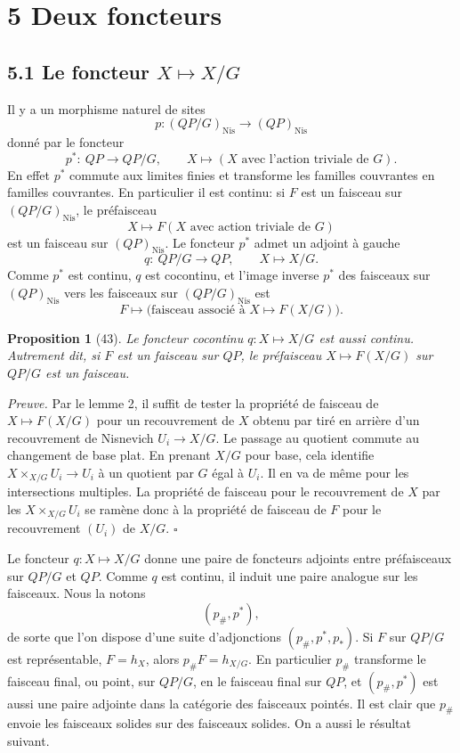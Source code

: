\documentclass[11pt]{article}
\newcommand{\Nis}{\mathrm{Nis}}
\theoremstyle{deligne}
\newtheorem*{proposition*}{Proposition}
\newenvironment{proofdel}{\noindent\textit{Preuve.}}{\hfill$\square$}
\begin{document}
\section*{5 Deux foncteurs}

\subsection*{5.1 Le foncteur \(X\mapsto X/G\)}

Il y a un morphisme naturel de sites
\[
p:(QP/G)_{\Nis}\longrightarrow (QP)_{\Nis}
\]
donné par le foncteur
\[
p^*:\ QP\longrightarrow QP/G,\qquad X\longmapsto (X\text{ avec l'action triviale de }G).
\]
En effet \(p^*\) commute aux limites finies et transforme les familles couvrantes en familles couvrantes. En particulier il est continu: si \(F\) est un faisceau sur \((QP/G)_{\Nis}\), le préfaisceau
\[
X\longmapsto F(X\text{ avec action triviale de }G)
\]
est un faisceau sur \((QP)_{\Nis}\). Le foncteur \(p^*\) admet un adjoint à gauche
\[
q:\ QP/G\longrightarrow QP,\qquad X\longmapsto X/G .
\]
Comme \(p^*\) est continu, \(q\) est cocontinu, et l'image inverse \(p^*\) des faisceaux sur \((QP)_{\Nis}\) vers les faisceaux sur \((QP/G)_{\Nis}\) est
\[
F\longmapsto \bigl(\text{faisceau associé à }X\longmapsto F(X/G)\bigr).
\]

\begin{proposition*}[43]
Le foncteur cocontinu \(q:X\mapsto X/G\) est aussi continu. Autrement dit, si \(F\) est un faisceau sur \(QP\), le préfaisceau \(X\mapsto F(X/G)\) sur \(QP/G\) est un faisceau.
\end{proposition*}

\begin{proofdel}
Par le lemme 2, il suffit de tester la propriété de faisceau de \(X\mapsto F(X/G)\) pour un recouvrement de \(X\) obtenu par tiré en arrière d'un recouvrement de Nisnevich \(U_i\to X/G\). Le passage au quotient commute au changement de base plat. En prenant \(X/G\) pour base, cela identifie \(X\times_{X/G}U_i\to U_i\) à un quotient par \(G\) égal à \(U_i\). Il en va de même pour les intersections multiples. La propriété de faisceau pour le recouvrement de \(X\) par les \(X\times_{X/G}U_i\) se ramène donc à la propriété de faisceau de \(F\) pour le recouvrement \((U_i)\) de \(X/G\).
\end{proofdel}

Le foncteur \(q:X\mapsto X/G\) donne une paire de foncteurs adjoints entre préfaisceaux sur \(QP/G\) et \(QP\). Comme \(q\) est continu, il induit une paire analogue sur les faisceaux. Nous la notons
\[
(p_\#,p^*),
\]
de sorte que l'on dispose d'une suite d'adjonctions \((p_\#,p^*,p_*)\). Si \(F\) sur \(QP/G\) est représentable, \(F=h_X\), alors \(p_\#F=h_{X/G}\). En particulier \(p_\#\) transforme le faisceau final, ou point, sur \(QP/G\), en le faisceau final sur \(QP\), et \((p_\#,p^*)\) est aussi une paire adjointe dans la catégorie des faisceaux pointés. Il est clair que \(p_\#\) envoie les faisceaux solides sur des faisceaux solides. On a aussi le résultat suivant.
\end{document}
